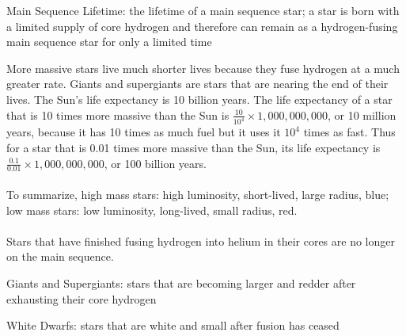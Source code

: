 \documentclass[12pt]{article}
\begin{document}
\begin{definition} Main Sequence Lifetime: the lifetime of a main sequence star; a star is born with a limited supply of core hydrogen and therefore can remain as a hydrogen-fusing main sequence star for only a limited time \end{definition}
More massive stars live much shorter lives because they fuse hydrogen at a much greater rate. Giants and supergiants are stars that are nearing the end of their lives. The Sun's life expectancy is 10 billion years. The life expectancy of a star that is 10 times more massive than the Sun is $\frac{10}{10^4} \times 1,000,000,000$, or 10 million years, because it has 10 times as much fuel but it uses it $10^4$ times as fast. Thus for a star that is 0.01 times more massive than the Sun, its life expectancy is $\frac{0.1}{0.01} \times 1,000,000,000$, or 100 billion years. \\~\\
To summarize, high mass stars: high luminosity, short-lived, large radius, blue; low mass stars: low luminosity, long-lived, small radius, red. \\~\\
Stars that have finished fusing hydrogen into helium in their cores are no longer on the main sequence. 
\begin{definition} Giants and Supergiants: stars that are becoming larger and redder after exhausting their core hydrogen \end{definition}
\begin{definition} White Dwarfs: stars that are white and small after fusion has ceased \end{definition}
\end{document}
